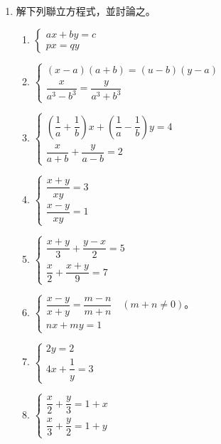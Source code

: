 \begin{enumerate}[1.]
  \item 解下列聯立方程式，並討論之。
  \begin{enumerate}[(1)]
    \item 
    $\begin{cases}
      ax+by = c \\
      px = qy
    \end{cases}$
    \item 
    $\begin{cases}
      (x-a)(a+b) = (u-b)(y-a) \\
      \dfrac{x}{a^3-b^3} = \dfrac{y}{a^3+b^3}
    \end{cases}$\footnotemark\label{item:ex4-4-1-2}
    \item 
    $\begin{cases}
      \left(\dfrac{1}{a}+\dfrac{1}{b}\right)x + \left(\dfrac{1}{a}-\dfrac{1}{b}\right)y = 4 \\
      \dfrac{x}{a+b} + \dfrac{y}{a-b} = 2
    \end{cases}$
    \item 
    $\begin{cases}
      \dfrac{x+y}{xy} = 3 \\
      \dfrac{x-y}{xy} = 1
    \end{cases}$\footnotemark\label{item:ex4-4-1-4}
    \item 
    $\begin{cases}
      \dfrac{x+y}{3} + \dfrac{y-x}{2} = 5 \\
      \dfrac{x}{2} + \dfrac{x+y}{9} = 7
    \end{cases}$
    \item 
    $\begin{cases}
      \dfrac{x-y}{x+y} = \dfrac{m-n}{m+n} \quad (m+n \neq 0) \text{。} \\
      nx + my = 1
    \end{cases}$
    \item 
    $\begin{cases}
      2y = 2 \\
      4x + \dfrac{1}{y} = 3
    \end{cases}$
    \item 
    $\begin{cases}
      \dfrac{x}{2} + \dfrac{y}{3} = 1+x \\
      \dfrac{x}{3} + \dfrac{y}{2} = 1+y
    \end{cases}$
  \end{enumerate}
\end{enumerate}

